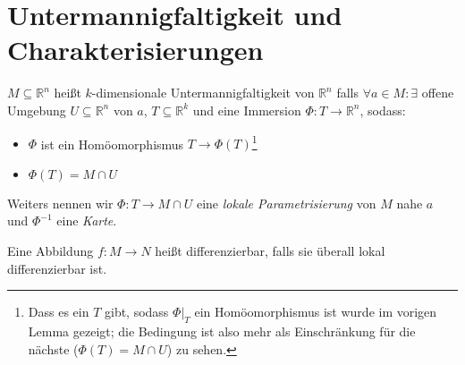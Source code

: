 \section{Untermannigfaltigkeit und Charakterisierungen}
\begin{definition}[Untermannigfaltigkeit]
	$M \subseteq \mathbb R^n$ hei\ss t $k$-dimensionale Untermannigfaltigkeit von $\mathbb R^n$ falls $\forall a\in M: \exists$ offene Umgebung $U\subseteq \mathbb R^n$ von $a$, $T\subseteq \mathbb R^k$ und eine Immersion $\Phi:T\rightarrow \mathbb R^n$, sodass:
	\begin{itemize}
		\item $\Phi$ ist ein Hom\"oomorphismus $T\rightarrow \Phi(T)$\footnote{Dass es ein $T$ gibt, sodass $\Phi|_T$ ein Hom\"oomorphismus ist wurde im vorigen Lemma gezeigt; die Bedingung ist also mehr als Einschr\"ankung f\"ur die n\"achste ($\Phi(T) = M\cap U$) zu sehen.}
		\item $\Phi(T) = M\cap U$
	\end{itemize}
	
	Weiters nennen wir $\Phi:T \rightarrow M\cap U$ eine \textit{lokale Parametrisierung} von $M$ nahe $a$ und $\Phi^{-1}$ eine \textit{Karte}.
	
	Eine Abbildung $f:M\rightarrow N$ hei\ss t differenzierbar, falls sie \"uberall lokal differenzierbar ist.
\end{definition}



